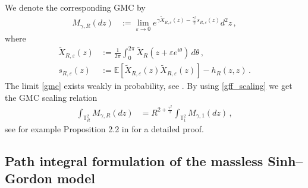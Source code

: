 \documentclass[11pt]{article}
\numberwithin{equation}{section}
\newcounter{exa}
\theoremstyle{definition}
\renewcommand{\tilde}{\widetilde}          %
\newcommand{\E}{\mathbb{E}}
\def\eps{\varepsilon}
\def\T{\mathbb{T}}
\newcommand{\ab}{|}
\newcommand{\tor}{{\T_1^2}}
\newcommand{\toR}{{\T_R^2}}
\begin{document}
We denote the corresponding GMC by
\begin{align}\label{gmc}
M_{\gamma,R}(dz) %
&:= \lim_{\eps \to 0}  e^{\gamma \tilde X_{R,\eps}(z) - \frac{\gamma^2}{2} s_{R,\eps}(z)}  d^2z \,,
\end{align}
where
\begin{align*}
\tilde X_{R,\eps}(z) &:= \tfrac{1}{2\pi} \int_0^{2\pi} \tilde X_R(z+\eps e^{i \theta}) \, d \theta\,, \\
s_{R,\eps}(z) &:= \E[\tilde X_{R,\eps}(z) \tilde X_{R,\eps}(z)] - h_R(z,z)\,.
\end{align*}
The limit \eqref{gmc} exists weakly in probability, see \cite{Ber}. By using \eqref{gff_scaling} we get the GMC scaling relation
\begin{align}\label{gmc_scaling}
\int_{\toR} M_{\gamma,R}(dz) %
&= R^{2 + \frac{\gamma^2}{2}} \int_{\tor} M_{\gamma,1}(dz)\,,
\end{align}
see for example Proposition 2.2 in \cite{KuOi20} for a detailed proof.

\subsection{Path integral formulation of the massless Sinh--Gordon model}
\end{document}
